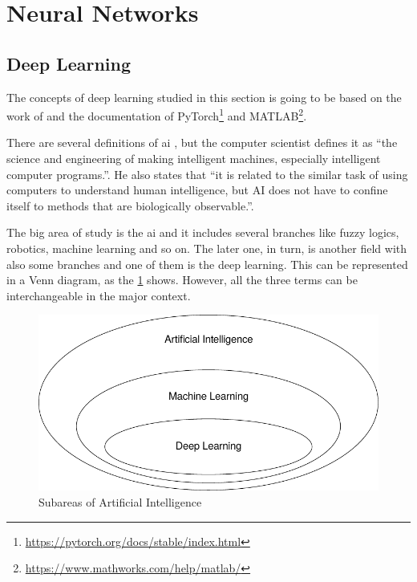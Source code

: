 \section{Neural Networks}

\subsection{Deep Learning}

The concepts of deep learning studied in this section is going to be based on the work of \citet{goodfellow2016} and the documentation of PyTorch\footnote{\url{https://pytorch.org/docs/stable/index.html}} and MATLAB\footnote{\url{https://www.mathworks.com/help/matlab/}}.

There are several definitions of \gls*{ai} \citep{winston1992}, but the  computer scientist \citet{mccarthy2007} defines it as ``the science and engineering of making intelligent machines, especially intelligent computer programs.''.
He also states that ``it is related to the similar task of using computers to understand human intelligence, but AI does not have to confine itself to methods that are biologically observable.''.

The big area of study is the \gls*{ai} and it includes several branches like fuzzy logics, robotics, machine learning and so on. 
The later one, in turn, is another field with also some branches and one of them is the deep learning.
This can be represented in a Venn diagram, as the \cref{fig:venn_dl} shows.
However, all the three terms can be interchangeable in the major context.

\begin{figure}[!htb]
    \centering
    \includegraphics{figures/2review/nn/venn_dl.pdf}
    \caption{Subareas of Artificial Intelligence}
    \label{fig:venn_dl}
\end{figure}

